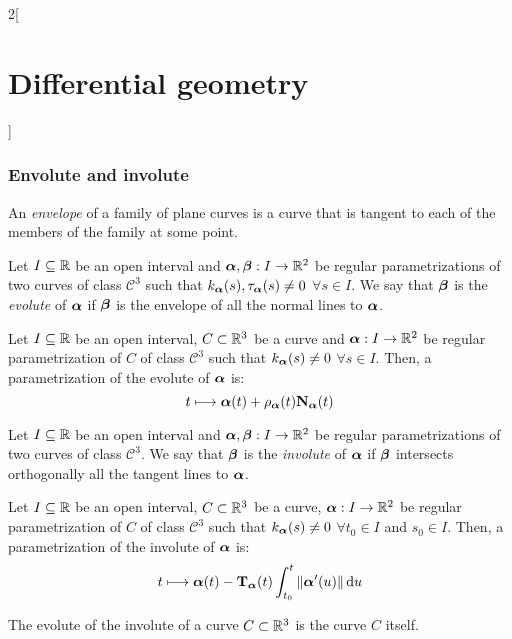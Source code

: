 \documentclass[../../../main.tex]{subfiles}
\begin{document}
\begin{multicols}{2}[\section{Differential geometry}]
  \subsubsection{Envolute and involute}
  \begin{definition}
    An \emph{envelope} of a family of plane curves is a curve that is tangent to each of the members of the family at some point.
  \end{definition}
  \begin{definition}
    Let $I\subseteq\mathbb{R}$ be an open interval and $\boldsymbol{\mathrm{\alpha}},\boldsymbol{\mathrm{\beta}}:I\rightarrow\mathbb{R}^2$ be regular parametrizations of two curves of class $\mathcal{C}^3$ such that $k_{\boldsymbol{\mathrm{\alpha}}}(s),{\tau_{\boldsymbol{\mathrm{\alpha}}}}(s)\ne 0$ $\forall s\in I$. We say that $\boldsymbol{\mathrm{\beta}}$ is the \emph{evolute} of $\boldsymbol{\mathrm{\alpha}}$ if $\boldsymbol{\mathrm{\beta}}$ is the envelope of all the normal lines to $\boldsymbol{\mathrm{\alpha}}$.
  \end{definition}
  \begin{proposition}
    Let $I\subseteq\mathbb{R}$ be an open interval, $C\subset\mathbb{R}^3$ be a curve and $\boldsymbol{\mathrm{\alpha}}:I\rightarrow\mathbb{R}^2$ be regular parametrization of $C$ of class $\mathcal{C}^3$ such that $k_{\boldsymbol{\mathrm{\alpha}}}(s)\ne 0$ $\forall s\in I$. Then, a parametrization of the evolute of $\boldsymbol{\mathrm{\alpha}}$ is: $$t\longmapsto \boldsymbol{\mathrm{\alpha}}(t)+{\rho_{\boldsymbol{\mathrm{\alpha}}}}(t){\boldsymbol{\mathrm{N}}_{\boldsymbol{\mathrm{\alpha}}}}(t)$$
  \end{proposition}
  \begin{definition}
    Let $I\subseteq\mathbb{R}$ be an open interval and $\boldsymbol{\mathrm{\alpha}},\boldsymbol{\mathrm{\beta}}:I\rightarrow\mathbb{R}^2$ be regular parametrizations of two curves of class $\mathcal{C}^3$. We say that $\boldsymbol{\mathrm{\beta}}$ is the \emph{involute} of $\boldsymbol{\mathrm{\alpha}}$ if $\boldsymbol{\mathrm{\beta}}$ intersects orthogonally all the tangent lines to $\boldsymbol{\mathrm{\alpha}}$.
  \end{definition}
  \begin{proposition}
    Let $I\subseteq\mathbb{R}$ be an open interval, $C\subset\mathbb{R}^3$ be a curve, $\boldsymbol{\mathrm{\alpha}}:I\rightarrow\mathbb{R}^2$ be regular parametrization of $C$ of class $\mathcal{C}^3$ such that $k_{\boldsymbol{\mathrm{\alpha}}}(s)\ne 0$ $\forall t_0\in I$ and $s_0\in I$. Then, a parametrization of the involute of $\boldsymbol{\mathrm{\alpha}}$ is: $$t\longmapsto \boldsymbol{\mathrm{\alpha}}(t)-{\boldsymbol{\mathrm{T}}_{\boldsymbol{\mathrm{\alpha}}}}(t) \int_{t_0}^t\|\boldsymbol{\mathrm{\alpha}}'(u)\|\dd{u}$$
  \end{proposition}
  \begin{proposition}
    The evolute of the involute of a curve $C\subset\mathbb{R}^3$ is the curve $C$ itself.
  \end{proposition}
  \begin{center}
    \begin{minipage}{\linewidth}
      \centering
      
    \end{minipage}
  \end{center}

\end{multicols}
\end{document}
